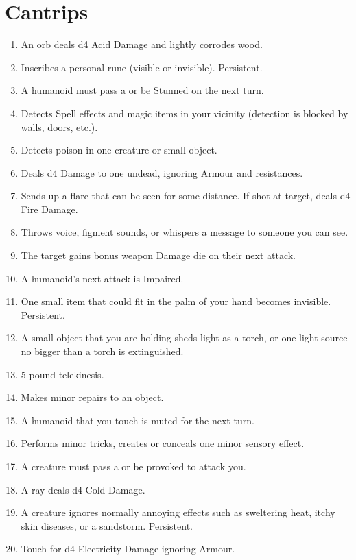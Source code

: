 \documentclass[itdr]{subfiles}
\begin{document}
\section{Cantrips}
\def \spellcircle {C}
\begin{enumerate}
	\item {} An orb deals d4 Acid Damage and lightly corrodes wood.
	\item {} Inscribes a personal rune (visible or invisible). Persistent.
	\item {} A humanoid must pass a  or be Stunned on the next turn.
	\item {} Detects Spell effects and magic items in your vicinity (detection is blocked by walls, doors, etc.).
	\item {} Detects poison in one creature or small object.
	\item {} Deals d4 Damage to one \mbox{undead}, ignoring Armour and resistances.
	\item {} Sends up a flare that can be seen for some distance. If shot at target, deals d4 Fire Damage.
	\item {} Throws voice, figment sounds, or whispers a message to someone you can see.
	\item {} The target gains bonus weapon Damage die on their next attack.
	\item {} A humanoid's next attack is Impaired.
	\item {} One small item that could fit in the palm of your hand becomes invisible. Persistent.
	\item {} A small object that you are holding sheds light as a torch, or one light source no bigger than a torch is extinguished.
	\item {} 5-pound telekinesis.
	\item {} Makes minor repairs to an object.
	\item {} A humanoid that you touch is muted for the next turn.
	\item {} Performs minor tricks, creates or conceals one minor sensory effect.
	\item {} A creature must pass a  or be provoked to attack you.
	\item {} A ray deals d4 Cold Damage.
	\item {} A creature ignores normally annoying effects such as sweltering heat, itchy skin diseases, or a sandstorm. Persistent.
	\item {} Touch for d4 Electricity Damage ignoring Armour.
\end{enumerate}
\end{document}
